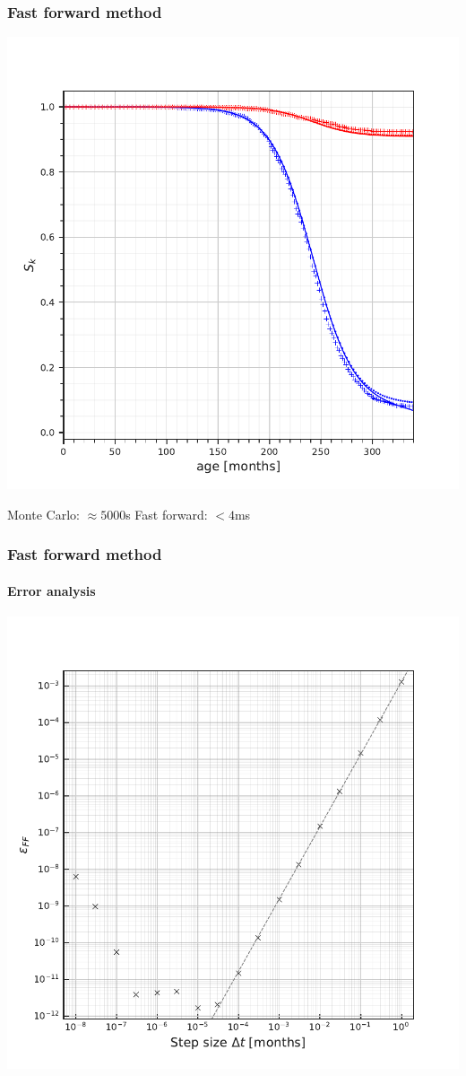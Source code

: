 \documentclass{beamer}
\begin{document}
\begin{frame}
    \frametitle{Fast forward method}

    \begin{center}
    \includegraphics[height=0.8\textheight]{figures/SCurveComparison.pdf}
    \end{center}

    Monte Carlo: $\approx 5000$s
    Fast forward: $<4$ms
\end{frame}

\begin{frame}
    \frametitle{Fast forward method}
    \framesubtitle{Error analysis}
    \begin{center}
        \includegraphics[height=0.9\textheight]{figures/Global_error_ffwdmethod_max}
    \end{center}
\end{frame}
\end{document}

